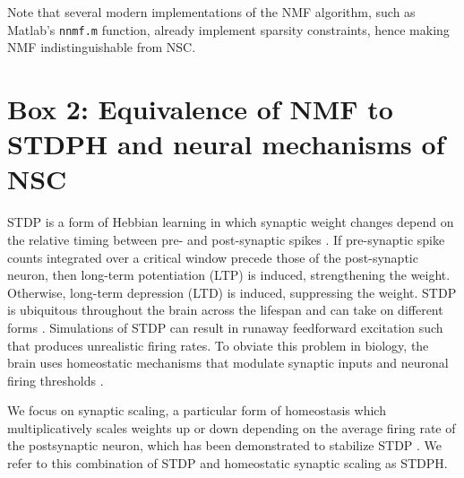 Note that several modern implementations of the \ac{NMF} algorithm,
such as Matlab's \texttt{nnmf.m} function,
already implement sparsity constraints,
hence making \ac{NMF} indistinguishable from \ac{NSC}.



\section{Box 2: Equivalence of NMF to STDPH and neural mechanisms of NSC}
\label{Box:NMFvSTDPH}

\Acf{STDP} is a form of Hebbian learning in which synaptic weight changes
depend on the relative timing between pre- and post-synaptic spikes \citep{BiPoo1998,SongAbbott2000}. If pre-synaptic spike counts integrated over a critical window precede those of the post-synaptic neuron, then long-term potentiation (LTP) is induced, strengthening the weight. Otherwise, long-term depression (LTD) is induced, suppressing the weight. STDP is ubiquitous throughout the brain across the lifespan and can take on different forms \citep{Caporale2008STDP,Holtmaat2009STDP}. Simulations of \ac{STDP} can result in runaway feedforward excitation such that produces unrealistic firing rates. To obviate this problem in biology, the brain uses homeostatic mechanisms that modulate synaptic inputs and neuronal firing thresholds \citep{Watt2010}.

We focus on synaptic scaling, a particular form of homeostasis which
multiplicatively scales weights up or down
depending on the average firing rate of the postsynaptic neuron, which has
been demonstrated to stabilize \ac{STDP} \citep{Carlson2013,Buonomano2005,VanRossum2000}.
We refer to this combination of \ac{STDP} and homeostatic synaptic scaling
as \ac{STDPH}.


